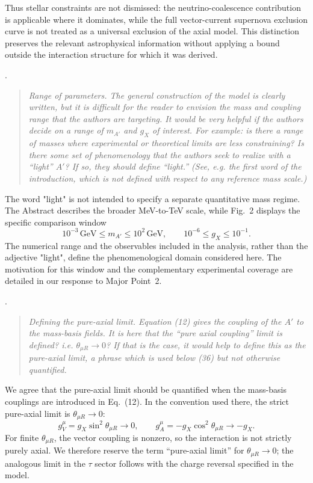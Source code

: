 \documentclass[12pt,a4paper]{article}
\begin{document}
Thus stellar constraints are not dismissed: the neutrino-coalescence contribution is applicable where it dominates, while the full vector-current supernova exclusion curve is not treated as a universal exclusion of the axial model. This distinction preserves the relevant astrophysical information without applying a bound outside the interaction structure for which it was derived.

\medskip
{}. \begin{quote}\itshape
Range of parameters. The general construction of the model is clearly written, but it is difficult for the reader to envision the mass and coupling range that the authors are targeting. It would be very helpful if the authors decide on a range of \(m_{A'}\) and \(g_X\) of interest. For example: is there a range of masses where experimental or theoretical limits are less constraining? Is there some set of phenomenology that the authors seek to realize with a ``light'' \(A'\)? If so, they should define ``light.'' (See, e.g. the first word of the introduction, which is not defined with respect to any reference mass scale.)\end{quote}

The word "light" is not intended to specify a separate quantitative mass regime. The Abstract describes the broader MeV-to-TeV scale, while Fig.~2 displays the specific comparison window
\[
10^{-3}\,\mathrm{GeV}\leq m_{A'}\leq10^2\,\mathrm{GeV},
\qquad
10^{-6}\leq g_X\leq10^{-1}.
\]
The numerical range and the observables included in the analysis, rather than the adjective "light", define the phenomenological domain considered here. The motivation for this window and the complementary experimental coverage are detailed in our response to Major Point~2.

\medskip
{}.
\begin{quote}\itshape
Defining the pure-axial limit. Equation (12) gives the coupling of the \(A'\) to the mass-basis fields. It is here that the ``pure axial coupling'' limit is defined? i.e. \(\theta_{\mu R}\to0\)? If that is the case, it would help to define this as the pure-axial limit, a phrase which is used below (36) but not otherwise quantified.
\end{quote}


We agree that the pure-axial limit should be quantified when the mass-basis couplings are introduced in Eq.~(12). In the convention used there, the strict pure-axial limit is \(\theta_{\mu R}\to0\):
\[
g_V^\mu=g_X\sin^2\theta_{\mu R}\to0,
\qquad
g_A^\mu=-g_X\cos^2\theta_{\mu R}\to-g_X.
\]
For finite \(\theta_{\mu R}\), the vector coupling is nonzero, so the interaction is not strictly purely axial. We therefore reserve the term ``pure-axial limit'' for \(\theta_{\mu R}\to0\); the analogous limit in the \(\tau\) sector follows with the charge reversal specified in the model.
\end{document}
